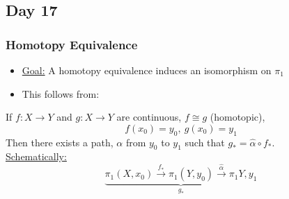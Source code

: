 \subsection{Day 17}
\subsubsection{Homotopy Equivalence}
\begin{itemize}
    \item \underline{Goal:} A homotopy equivalence induces an isomorphism on $\pi_1$
    \item This follows from:
\end{itemize}
\begin{theorem}
    If $f: X\rightarrow Y$ and $g: X\rightarrow Y$ are continuous, $f\cong g$ (homotopic),
    \[
        f(x_0)=y_0,\ g(x_0)=y_1
    \]
    Then there exists a path, $\alpha$ from $y_0$ to $y_1$ such that 
    $g_* = \hat{\alpha}\circ f_*$.\\
    \underline{Schematically:}
    \[
        \underbrace{\pi_1(X,x_0)\xrightarrow{f_*}\pi_1(Y,y_0)
            \xrightarrow{\hat{{\alpha}}}\pi_1{Y,y_1}}_{g_*}
    \]
\end{theorem}
